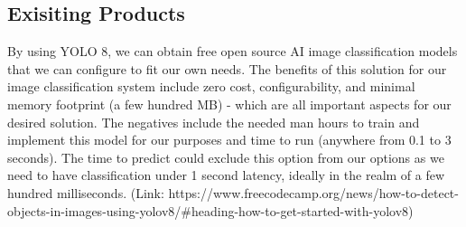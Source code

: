 \subsection{Exisiting Products}

By using YOLO 8, we can obtain free open source AI image classification models that we can configure to fit our own needs. The benefits of this solution for our image classification system include zero cost, configurability, and minimal memory footprint (a few hundred MB) - which are all important aspects for our desired solution. The negatives include the needed man hours to train and implement this model for our purposes and time to run (anywhere from 0.1 to 3 seconds). The time to predict could exclude this option from our options as we need to have classification under 1 second latency, ideally in the realm of a few hundred milliseconds.
(Link: https://www.freecodecamp.org/news/how-to-detect-objects-in-images-using-yolov8/#heading-how-to-get-started-with-yolov8) 
\newline 

\newline